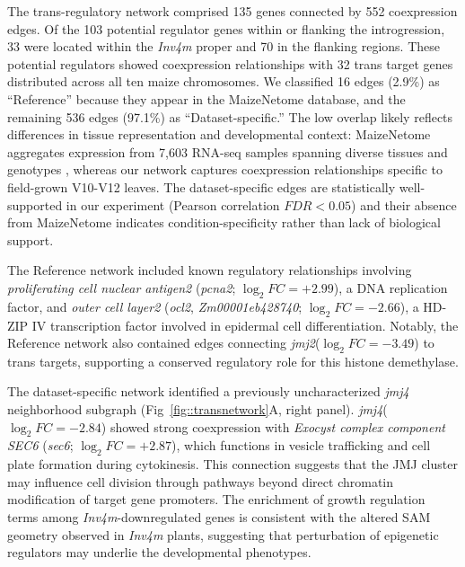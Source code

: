 \documentclass[9pt,twocolumn,twoside]{rilabRxiv}
\newcommand{\invfour}{\textit{Inv4m}\xspace}
\newcommand{\jmjii}{\textit{jmj2}\xspace}
\newcommand{\jmjiv}{\textit{jmj4}\xspace}
\begin{document}
The trans-regulatory network comprised 135 genes connected by 552 coexpression edges.
Of the 103 potential regulator genes within or flanking the introgression, 33 were located within the \invfour proper and 70 in the flanking regions.
These potential regulators showed coexpression relationships with 32 trans target genes distributed across all ten maize chromosomes.
We classified 16 edges (2.9\%) as ``Reference'' because they appear in the MaizeNetome database, and the remaining 536 edges (97.1\%) as ``Dataset-specific.''
The low overlap likely reflects differences in tissue representation and developmental context: MaizeNetome aggregates expression from 7,603 RNA-seq samples spanning diverse tissues and genotypes \cite{feng2023}, whereas our network captures coexpression relationships specific to field-grown V10-V12 leaves.
The dataset-specific edges are statistically well-supported in our experiment (Pearson correlation $FDR < 0.05$) and their absence from MaizeNetome indicates condition-specificity rather than lack of biological support.

The Reference network included known regulatory relationships involving \textit{proliferating cell nuclear antigen2} (\textit{pcna2}; $\log_2 FC = +2.99$), a DNA replication factor, and \textit{outer cell layer2} (\textit{ocl2}, \textit{Zm00001eb428740}; $\log_2 FC = -2.66$), a HD-ZIP IV transcription factor involved in epidermal cell differentiation.
Notably, the Reference network also contained edges connecting \jmjii ($\log_2 FC = -3.49$) to trans targets, supporting a conserved regulatory role for this histone demethylase.

The dataset-specific network identified a previously uncharacterized \jmjiv neighborhood subgraph (Fig~\ref{fig::transnetwork}A, right panel).
\jmjiv ($\log_2 FC = -2.84$) showed strong coexpression with \textit{Exocyst complex component SEC6} (\textit{sec6}; $\log_2 FC = +2.87$), which functions in vesicle trafficking and cell plate formation during cytokinesis.
This connection suggests that the JMJ cluster may influence cell division through pathways beyond direct chromatin modification of target gene promoters.
The enrichment of growth regulation terms among \invfour-downregulated genes is consistent with the altered SAM geometry observed in \invfour plants, suggesting that perturbation of epigenetic regulators may underlie the developmental phenotypes.
\end{document}
